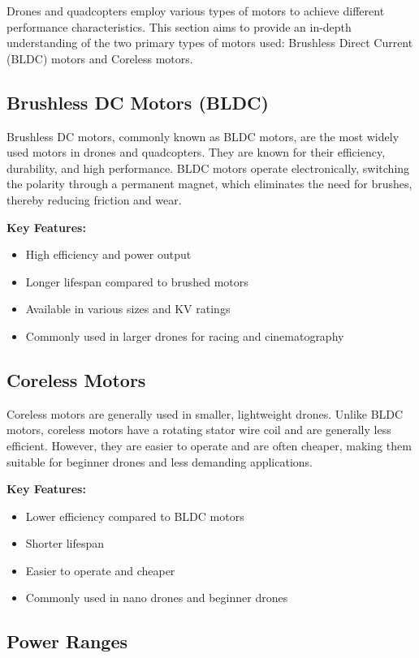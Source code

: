 \documentclass[12pt]{article}
\begin{document}
	Drones and quadcopters employ various types of motors to achieve different performance characteristics. This section aims to provide an in-depth understanding of the two primary types of motors used: Brushless Direct Current (BLDC) motors and Coreless motors.
	
	\subsection{Brushless DC Motors (BLDC)}
	
	Brushless DC motors, commonly known as BLDC motors, are the most widely used motors in drones and quadcopters. They are known for their efficiency, durability, and high performance. BLDC motors operate electronically, switching the polarity through a permanent magnet, which eliminates the need for brushes, thereby reducing friction and wear.
	
	\textbf{Key Features:}
	\begin{itemize}
		\item High efficiency and power output
		\item Longer lifespan compared to brushed motors
		\item Available in various sizes and KV ratings
		\item Commonly used in larger drones for racing and cinematography
	\end{itemize}
	
	\subsection{Coreless Motors}
	
	Coreless motors are generally used in smaller, lightweight drones. Unlike BLDC motors, coreless motors have a rotating stator wire coil and are generally less efficient. However, they are easier to operate and are often cheaper, making them suitable for beginner drones and less demanding applications.
	
	\textbf{Key Features:}
	\begin{itemize}
		\item Lower efficiency compared to BLDC motors
		\item Shorter lifespan
		\item Easier to operate and cheaper
		\item Commonly used in nano drones and beginner drones
	\end{itemize}
	
	\subsection{Power Ranges}
	
\end{document}

